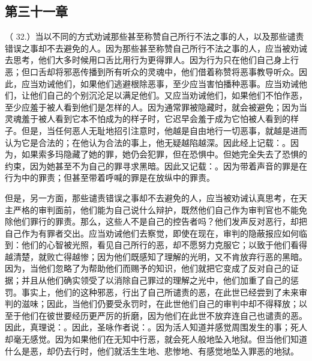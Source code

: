 
\subsection{第三十一章}

\par

（ 32.）当以不同的方式劝诫那些甚至称赞自己所行不法之事的人，以及那些谴责错误之事却不去避免的人。因为那些甚至称赞自己所行不法之事的人，应当被劝诫去思考，他们大多时候用口舌比用行为更得罪人。因为行为只在他们自己身上行恶；但口舌却将邪恶传播到所有听众的灵魂中，他们借着称赞将恶事教导听众。因此，应当劝诫他们，如果他们逃避根除恶事，至少应当害怕播种恶事。应当劝诫他们，让他们自己的个别沉沦足以满足他们。又应当劝诫他们，如果他们不怕作恶，至少应羞于被人看到他们是怎样的人。因为通常罪被隐藏时，就会被避免；因为当灵魂羞于被人看到它本不怕成为的样子时，它迟早会羞于成为它怕被人看到的样子。但是，当任何恶人无耻地招引注意时，他越是自由地行一切恶事，就越是进而认为它是合法的；在他认为合法的事上，他无疑越陷越深。因此经上记载：。因为，如果索多玛隐藏了她的罪，她仍会犯罪，但在恐惧中。但她完全失去了恐惧的约束，因为她甚至不为自己的罪寻求黑暗。因此又记载：。因为带着声音的罪是在行为中的罪责；但甚至带着呼喊的罪是在放纵中的罪责。\par

但是，另一方面，那些谴责错误之事却不去避免的人，应当被劝诫认真思考，在天主严格的审判面前，他们能为自己说什么辩护，既然他们自己作为审判官也不能免除他们罪行的罪责。那么，这些人不是自己的控告者吗？他们发声反对恶行，却把自己作为有罪者交出。应当劝诫他们去察觉，即使在现在，审判的隐蔽报应如何临到：他们的心智被光照，看见自己所行的恶，却不愿努力克服它；以致于他们看得越清楚，就败亡得越惨；因为他们既感知了理解的光明，又不肯放弃行恶的黑暗。因为，当他们忽略了为帮助他们而赐予的知识，他们就把它变成了反对自己的证据；并且从他们确实领受了以消除自己罪过的理解之光中，他们加重了自己的惩罚。事实上，他们的这种邪恶，行出了自己所谴责的恶，在此世已经尝到了未来审判的滋味；因此，当他们仍要受永罚时，在此世他们自己的审判中却不得释放；以至于他们在彼世要经历更严厉的折磨，因为他们在此世不放弃连自己也谴责的恶。因此，真理说：。因此，圣咏作者说：。因为活人知道并感觉周围发生的事；死人却毫无感觉。因为如果他们在无知中行恶，就会死人般地坠入地狱。但当他们知道什么是恶，却仍去行时，他们就活生生地、悲惨地、有感觉地坠入罪恶的地狱。\par

